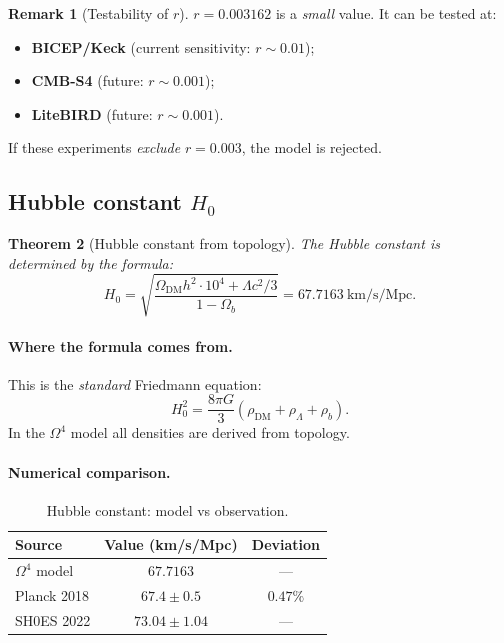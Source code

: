 \documentclass[11pt,a4paper]{article}
\newcommand{\Om}{\Omega^4}
\newtheorem{theorem}{Theorem}[section]
\theoremstyle{definition}
\newtheorem{remark}[theorem]{Remark}
\begin{document}
\begin{remark}[Testability of $r$]
\label{rem:r-testability}
$r = 0.003162$ is a \emph{small} value. It can be tested 
at:
\begin{itemize}
    \item \textbf{BICEP/Keck} (current sensitivity: 
          $r \sim 0.01$);
    \item \textbf{CMB-S4} (future: $r \sim 0.001$);
    \item \textbf{LiteBIRD} (future: $r \sim 0.001$).
\end{itemize}
If these experiments \emph{exclude} $r = 0.003$, 
the model is rejected.
\end{remark}

\subsection{Hubble constant $H_0$}
\label{subsec:h0}

\begin{theorem}[Hubble constant from topology]
\label{thm:h0}
The Hubble constant is determined by the formula:
\begin{equation}
    \boxed{
    H_0 = \sqrt{\frac{\Omega_{\text{DM}} h^2 \cdot 10^4 
    + \Lambda c^2 / 3}{1 - \Omega_b}}
    = 67.7163~\text{km/s/Mpc}.
    }
    \label{eq:h0-main}
\end{equation}
\end{theorem}

\paragraph{Where the formula comes from.}
This is the \emph{standard} Friedmann equation:
\begin{equation}
    H_0^2 = \frac{8\pi G}{3}(\rho_{\text{DM}} + \rho_\Lambda 
    + \rho_b).
\end{equation}
In the $\Om$ model all densities are derived from topology.

\paragraph{Numerical comparison.}
\begin{table}[htbp]
\centering
\caption{Hubble constant: model vs observation.}
\label{tab:h0-comparison}
\begin{tabular}{lcc}
\toprule
Source & Value (km/s/Mpc) & Deviation \\ 
\midrule
$\Om$ model & $67.7163$ & --- \\[0.3em]
Planck 2018 & $67.4 \pm 0.5$ & $0.47\%$ \\[0.3em]
SH0ES 2022 & $73.04 \pm 1.04$ & --- \\ 
\bottomrule
\end{tabular}
\end{table}
\end{document}
